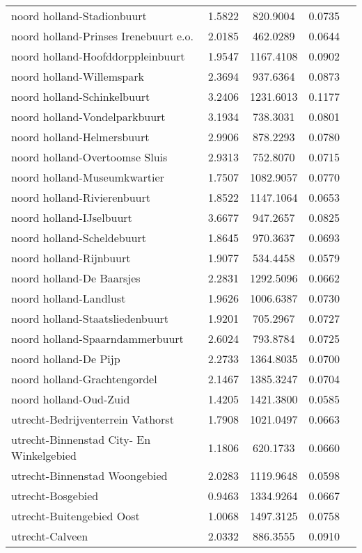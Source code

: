 \begin{longtable}{llccc}
noord holland-Stadionbuurt & 1.5822 & 820.9004 & 0.0735 \\
noord holland-Prinses Irenebuurt e.o. & 2.0185 & 462.0289 & 0.0644 \\
noord holland-Hoofddorppleinbuurt & 1.9547 & 1167.4108 & 0.0902 \\
noord holland-Willemspark & 2.3694 & 937.6364 & 0.0873 \\
noord holland-Schinkelbuurt & 3.2406 & 1231.6013 & 0.1177 \\
noord holland-Vondelparkbuurt & 3.1934 & 738.3031 & 0.0801 \\
noord holland-Helmersbuurt & 2.9906 & 878.2293 & 0.0780 \\
noord holland-Overtoomse Sluis & 2.9313 & 752.8070 & 0.0715 \\
noord holland-Museumkwartier & 1.7507 & 1082.9057 & 0.0770 \\
noord holland-Rivierenbuurt & 1.8522 & 1147.1064 & 0.0653 \\
noord holland-IJselbuurt & 3.6677 & 947.2657 & 0.0825 \\
noord holland-Scheldebuurt & 1.8645 & 970.3637 & 0.0693 \\
noord holland-Rijnbuurt & 1.9077 & 534.4458 & 0.0579 \\
noord holland-De Baarsjes & 2.2831 & 1292.5096 & 0.0662 \\
noord holland-Landlust & 1.9626 & 1006.6387 & 0.0730 \\
noord holland-Staatsliedenbuurt & 1.9201 & 705.2967 & 0.0727 \\
noord holland-Spaarndammerbuurt & 2.6024 & 793.8784 & 0.0725 \\
noord holland-De Pijp & 2.2733 & 1364.8035 & 0.0700 \\
noord holland-Grachtengordel & 2.1467 & 1385.3247 & 0.0704 \\
noord holland-Oud-Zuid & 1.4205 & 1421.3800 & 0.0585 \\
utrecht-Bedrijventerrein Vathorst & 1.7908 & 1021.0497 & 0.0663 \\
utrecht-Binnenstad City- En Winkelgebied & 1.1806 & 620.1733 & 0.0660 \\
utrecht-Binnenstad Woongebied & 2.0283 & 1119.9648 & 0.0598 \\
utrecht-Bosgebied & 0.9463 & 1334.9264 & 0.0667 \\
utrecht-Buitengebied Oost & 1.0068 & 1497.3125 & 0.0758 \\
utrecht-Calveen & 2.0332 & 886.3555 & 0.0910 \\

\end{longtable}
